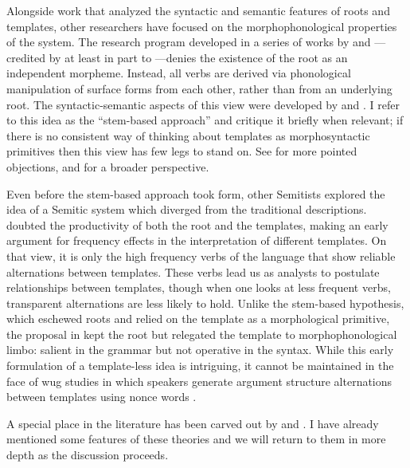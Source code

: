 \begin{exe}
\begin{xlist}
\begin{exe}
\begin{exe}
\begin{exe}
\begin{exe}
\begin{xlist}
\begin{exe}
\begin{xlist}
\begin{xlist}
\begin{xlist}
\begin{exe}
\begin{xlist}
\begin{exe}
\begin{exe}
Alongside work that analyzed the syntactic and semantic features of roots and templates, other researchers have focused on the morphophonological properties of the system. The research program developed in a series of works by \cite{batel89,batel94} and \cite{ussishkin99,ussishkin00phd,ussishkin05}---credited by \cite{ussishkin00phd} at least in part to \cite{horvath81}---denies the existence of the root as an independent morpheme. Instead, all verbs are derived via phonological manipulation of surface forms from each other, rather than from an underlying root. The syntactic-semantic aspects of this view were developed by \cite{reinhartsiloni05} and \cite{laks11,laks13morpho,laks14,laks18}. I refer to this idea as the ``stem-based approach'' and critique it briefly when relevant; if there is no consistent way of thinking about templates as morphosyntactic primitives then this view has few legs to stand on. See \cite{kastner17gjgl,kastner18nllt} for more pointed objections, and \cite{kastnertucker19cup} for a broader perspective.

Even before the stem-based approach took form, other Semitists explored the idea of a Semitic system which diverged from the traditional descriptions. \cite{schwarzwald73} doubted the productivity of both the root and the templates, making an early argument for frequency effects in the interpretation of different templates. On that view, it is only the high frequency verbs of the language that show reliable alternations between templates. These verbs lead us as analysts to postulate relationships between templates, though when one looks at less frequent verbs, transparent alternations are less likely to hold. Unlike the stem-based hypothesis, which eschewed roots and relied on the template as a morphological primitive, the proposal in \cite{schwarzwald73} kept the root but relegated the template to morphophonological limbo: salient in the grammar but not operative in the syntax. While this early formulation of a template-less idea is intriguing, it cannot be maintained in the face of wug studies in which speakers generate argument structure alternations between templates using nonce words \citep{berman93jcl,moorecantwell13}.

A special place in the literature has been carved out by \cite{doron03,doron13voice} and \cite{arad03,arad05}. I have already mentioned some features of these theories and we will return to them in more depth as the discussion proceeds.


\end{exe}
\end{exe}
\end{xlist}
\end{exe}
\end{xlist}
\end{xlist}
\end{xlist}
\end{exe}
\end{xlist}
\end{exe}
\end{exe}
\end{exe}
\end{exe}
\end{xlist}
\end{exe}

